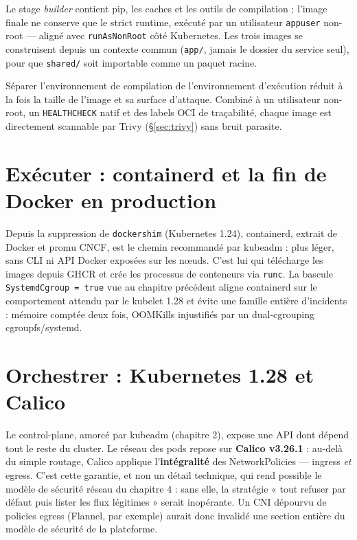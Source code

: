 \documentclass[12pt,a4paper,twoside,openright]{report}
\begin{document}
Le stage \emph{builder} contient pip, les caches et les outils de compilation ;
l'image finale ne conserve que le strict runtime, exécuté par un utilisateur
\texttt{appuser} non-root — aligné avec \texttt{runAsNonRoot} côté Kubernetes. Les
trois images se construisent depuis un contexte commun (\texttt{app/}, jamais le
dossier du service seul), pour que \texttt{shared/} soit importable comme un paquet
racine.

\begin{whybox}[title={Multi-stage : le standard des images de production}]
Séparer l'environnement de compilation de l'environnement d'exécution réduit à la
fois la taille de l'image et sa surface d'attaque. Combiné à un utilisateur non-root,
un \texttt{HEALTHCHECK} natif et des labels OCI de traçabilité, chaque image est
directement scannable par Trivy (\S\ref{sec:trivy}) sans bruit parasite.
\end{whybox}

\section{Exécuter : containerd et la fin de Docker en production}

Depuis la suppression de \texttt{dockershim} (Kubernetes 1.24), containerd, extrait
de Docker et promu CNCF, est le chemin recommandé par kubeadm : plus léger, sans CLI
ni API Docker exposées sur les nœuds. C'est lui qui télécharge les images depuis
GHCR et crée les processus de conteneurs via \texttt{runc}. La bascule
\texttt{SystemdCgroup = true} vue au chapitre précédent aligne containerd sur le
comportement attendu par le kubelet 1.28 et évite une famille entière d'incidents :
mémoire comptée deux fois, OOMKills injustifiés par un dual-cgrouping
cgroupfs/systemd.

\section{Orchestrer : Kubernetes 1.28 et Calico}

Le control-plane, amorcé par kubeadm (chapitre 2), expose une API dont dépend tout
le reste du cluster. Le réseau des pods repose sur \textbf{Calico v3.26.1} : au-delà
du simple routage, Calico applique l'\textbf{intégralité} des NetworkPolicies —
ingress \emph{et} egress. C'est cette garantie, et non un détail technique, qui rend
possible le modèle de sécurité réseau du chapitre 4 : sans elle, la stratégie
« tout refuser par défaut puis lister les flux légitimes » serait inopérante. Un
CNI dépourvu de policies egress (Flannel, par exemple) aurait donc invalidé une
section entière du modèle de sécurité de la plateforme.
\end{document}
